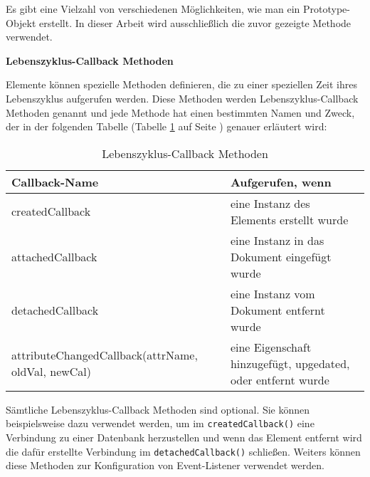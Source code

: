 Es gibt eine Vielzahl von verschiedenen Möglichkeiten, wie man ein Prototype-Objekt erstellt. In dieser Arbeit wird ausschließlich die zuvor gezeigte Methode verwendet.

\textbf{Lebenszyklus-Callback Methoden}

Elemente können spezielle Methoden definieren, die zu einer speziellen Zeit ihres Lebenszyklus aufgerufen werden. Diese Methoden werden Lebenszyklus-Callback Methoden genannt und jede Methode hat einen bestimmten Namen und Zweck, der in der folgenden Tabelle (Tabelle \ref{tab:Lifecycle_Callback_Methoden} auf Seite \pageref{tab:Lifecycle_Callback_Methoden}) genauer erläutert wird:

\begin{table}[h]
\centering
\begin{tabular}{ p{7cm} | p{7cm} }
Callback-Name & Aufgerufen, wenn \\
\hline
\hline
createdCallback & eine Instanz des Elements erstellt wurde\\
\hline
attachedCallback & eine Instanz in das Dokument eingefügt wurde\\
\hline
detachedCallback & eine Instanz vom Dokument entfernt wurde\\
\hline
attributeChangedCallback(attrName, oldVal, newCal) & eine Eigenschaft hinzugefügt, upgedated, oder entfernt wurde\\
\end{tabular}
\caption[
Lebenszyklus-Callback Methoden
]
{Lebenszyklus-Callback Methoden}
\label{tab:Lifecycle_Callback_Methoden}
\end{table}

Sämtliche Lebenszyklus-Callback Methoden sind optional. Sie können beispielsweise dazu verwendet werden, um im \lstinline|createdCallback()| eine Verbindung zu einer Datenbank herzustellen und wenn das Element entfernt wird die dafür erstellte Verbindung im \lstinline|detachedCallback()| schließen. Weiters können diese Methoden zur Konfiguration von Event-Listener verwendet werden.